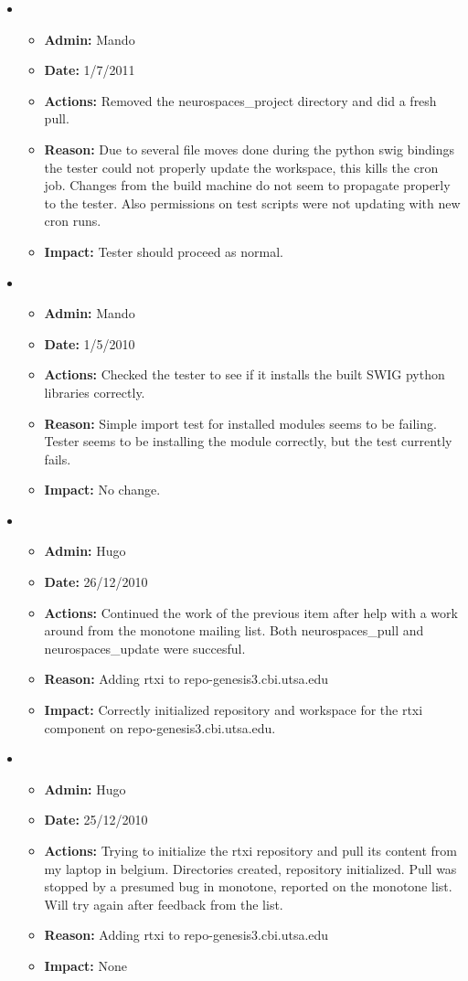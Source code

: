 \documentclass[12pt]{article}
\begin{document}
\begin{itemize}
\item
\begin{itemize}
\item[] {\bf Admin:} Mando
\item[] {\bf Date:} 1/7/2011 
\item[] {\bf Actions:} Removed the neurospaces\_project directory and did a fresh pull.
\item[] {\bf Reason:} Due to several file moves done during the python swig bindings the tester could not properly update the workspace, this kills the cron job. Changes from the build machine do not seem to propagate properly to the tester. Also permissions on test scripts were not updating with new cron runs.
\item[] {\bf Impact:} Tester should proceed as normal.
\end{itemize}


\item
\begin{itemize}
\item[] {\bf Admin:} Mando
\item[] {\bf Date:} 1/5/2010 
\item[] {\bf Actions:} Checked the tester to see if it installs the built
SWIG python libraries correctly.
\item[] {\bf Reason:} Simple import test for installed modules seems to be failing. Tester seems to be installing the module correctly, but the test currently fails.
\item[] {\bf Impact:} No change.
\end{itemize}

\item
\begin{itemize}
\item[] {\bf Admin:} Hugo
\item[] {\bf Date:} 26/12/2010 
\item[] {\bf Actions:} Continued the work of the previous item after
  help with a work around from the monotone mailing list.  Both
  neurospaces\_pull and neurospaces\_update were succesful.
\item[] {\bf Reason:} Adding rtxi to repo-genesis3.cbi.utsa.edu
\item[] {\bf Impact:} Correctly initialized repository and workspace
  for the rtxi component on repo-genesis3.cbi.utsa.edu.
\end{itemize}


\item
\begin{itemize}
\item[] {\bf Admin:} Hugo
\item[] {\bf Date:} 25/12/2010 
\item[] {\bf Actions:} Trying to initialize the rtxi repository and
  pull its content from my laptop in belgium.  Directories created,
  repository initialized.  Pull was stopped by a presumed bug in
  monotone, reported on the monotone list.  Will try again after
  feedback from the list.
\item[] {\bf Reason:} Adding rtxi to repo-genesis3.cbi.utsa.edu
\item[] {\bf Impact:} None
\end{itemize}



\end{itemize}
\end{document}
